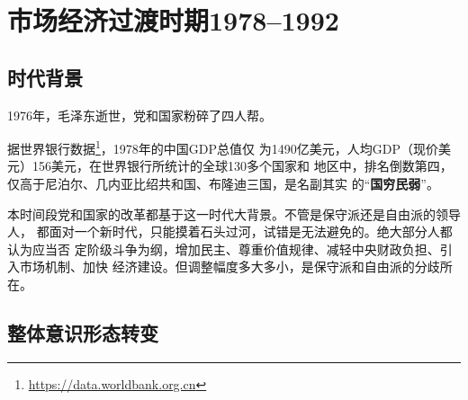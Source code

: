 \chapter{市场经济过渡时期1978--1992}
\label{chap:1978}

\section{时代背景}


1976年，毛泽东逝世，党和国家粉碎了四人帮。

据世界银行数据\footnote{\url{https://data.worldbank.org.cn}}，1978年的中国GDP总值仅
为1490亿美元，人均GDP（现价美元）156美元，在世界银行所统计的全球130多个国家和
地区中，排名倒数第四，仅高于尼泊尔、几内亚比绍共和国、布隆迪三国，是名副其实
的“\textbf{国穷民弱}”。

本时间段党和国家的改革都基于这一时代大背景。不管是保守派还是自由派的领导人，
都面对一个新时代，只能摸着石头过河，试错是无法避免的。绝大部分人都认为应当否
定阶级斗争为纲，增加民主、尊重价值规律、减轻中央财政负担、引入市场机制、加快
经济建设。但调整幅度多大多小，是保守派和自由派的分歧所在。


\section{整体意识形态转变}

